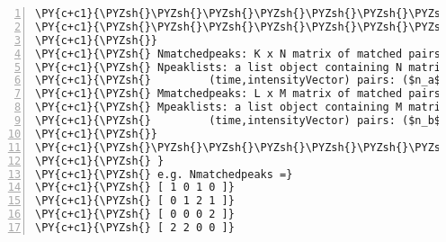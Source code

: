 \begin{Verbatim}[commandchars=\\\{\},codes={\catcode`\$=3\catcode`\^=7\catcode`\_=8},gobble=0,numbers=left,fontfamily=fvm,fontshape=n,fontsize=\footnotesize,tabsize=2]
\PY{c+c1}{\PYZsh{}\PYZsh{}\PYZsh{}\PYZsh{}\PYZsh{}\PYZsh{}\PYZsh{}\PYZsh{}\PYZsh{}\PYZsh{}\PYZsh{}\PYZsh{}\PYZsh{}\PYZsh{}\PYZsh{}\PYZsh{}\PYZsh{}\PYZsh{}\PYZsh{}\PYZsh{}\PYZsh{}\PYZsh{}\PYZsh{}\PYZsh{}\PYZsh{}\PYZsh{}\PYZsh{}\PYZsh{}\PYZsh{}\PYZsh{}\PYZsh{}\PYZsh{}\PYZsh{}\PYZsh{}\PYZsh{}\PYZsh{}\PYZsh{}\PYZsh{}\PYZsh{} Input \PYZsh{}\PYZsh{}\PYZsh{}\PYZsh{}\PYZsh{}\PYZsh{}\PYZsh{}\PYZsh{}\PYZsh{}\PYZsh{}\PYZsh{}\PYZsh{}\PYZsh{}\PYZsh{}\PYZsh{}\PYZsh{}\PYZsh{}\PYZsh{}\PYZsh{}\PYZsh{}\PYZsh{}\PYZsh{}\PYZsh{}\PYZsh{}\PYZsh{}\PYZsh{}\PYZsh{}\PYZsh{}\PYZsh{}\PYZsh{}\PYZsh{}\PYZsh{}\PYZsh{}}
\PY{c+c1}{\PYZsh{}\PYZsh{}\PYZsh{}\PYZsh{}\PYZsh{}\PYZsh{}\PYZsh{}\PYZsh{}\PYZsh{}\PYZsh{}\PYZsh{}\PYZsh{}\PYZsh{}\PYZsh{}\PYZsh{}\PYZsh{}\PYZsh{}\PYZsh{}\PYZsh{}\PYZsh{}\PYZsh{}\PYZsh{}\PYZsh{}\PYZsh{}\PYZsh{}\PYZsh{}\PYZsh{}\PYZsh{}\PYZsh{}\PYZsh{}\PYZsh{}\PYZsh{}\PYZsh{}\PYZsh{}\PYZsh{}\PYZsh{}\PYZsh{}\PYZsh{}\PYZsh{}\PYZsh{}\PYZsh{}\PYZsh{}\PYZsh{}\PYZsh{}\PYZsh{}\PYZsh{}\PYZsh{}\PYZsh{}\PYZsh{}\PYZsh{}\PYZsh{}\PYZsh{}\PYZsh{}\PYZsh{}\PYZsh{}\PYZsh{}\PYZsh{}\PYZsh{}\PYZsh{}\PYZsh{}\PYZsh{}\PYZsh{}\PYZsh{}\PYZsh{}\PYZsh{}\PYZsh{}\PYZsh{}\PYZsh{}\PYZsh{}\PYZsh{}\PYZsh{}\PYZsh{}\PYZsh{}\PYZsh{}\PYZsh{}\PYZsh{}\PYZsh{}\PYZsh{}\PYZsh{}}
\PY{c+c1}{\PYZsh{}}
\PY{c+c1}{\PYZsh{} Nmatchedpeaks: K x N matrix of matched pairs of the N alignment}
\PY{c+c1}{\PYZsh{} Npeaklists: a list object containing N matricies of  }
\PY{c+c1}{\PYZsh{}         (time,intensityVector) pairs: ($n_a$ x ($n_{Comp}$+1) matrix, a=1,...,N)}
\PY{c+c1}{\PYZsh{} Mmatchedpeaks: L x M matrix of matched pairs of the M alignment}
\PY{c+c1}{\PYZsh{} Mpeaklists: a list object containing M matricies of  }
\PY{c+c1}{\PYZsh{}         (time,intensityVector) pairs: ($n_b$ x ($n_{Comp}$+1) matrix, b=1,...,M)}
\PY{c+c1}{\PYZsh{}}
\PY{c+c1}{\PYZsh{}\PYZsh{}\PYZsh{}\PYZsh{}\PYZsh{}\PYZsh{}\PYZsh{}\PYZsh{}\PYZsh{}\PYZsh{}\PYZsh{}\PYZsh{}\PYZsh{}\PYZsh{}\PYZsh{}\PYZsh{}\PYZsh{}\PYZsh{}\PYZsh{}\PYZsh{}\PYZsh{}\PYZsh{}\PYZsh{}\PYZsh{}\PYZsh{}\PYZsh{}\PYZsh{}\PYZsh{}\PYZsh{}\PYZsh{}\PYZsh{}\PYZsh{}\PYZsh{}\PYZsh{}\PYZsh{}\PYZsh{}\PYZsh{}\PYZsh{}\PYZsh{}\PYZsh{}\PYZsh{}\PYZsh{}\PYZsh{}\PYZsh{}\PYZsh{}\PYZsh{}\PYZsh{}\PYZsh{}\PYZsh{}\PYZsh{}\PYZsh{}\PYZsh{}\PYZsh{}\PYZsh{}\PYZsh{}\PYZsh{}\PYZsh{}\PYZsh{}\PYZsh{}\PYZsh{}\PYZsh{}\PYZsh{}\PYZsh{}\PYZsh{}\PYZsh{}\PYZsh{}\PYZsh{}\PYZsh{}\PYZsh{}\PYZsh{}\PYZsh{}\PYZsh{}\PYZsh{}\PYZsh{}\PYZsh{}\PYZsh{}\PYZsh{}\PYZsh{}\PYZsh{}}
\PY{c+c1}{\PYZsh{} }
\PY{c+c1}{\PYZsh{} e.g. Nmatchedpeaks =}
\PY{c+c1}{\PYZsh{} [ 1 0 1 0 ]}
\PY{c+c1}{\PYZsh{} [ 0 1 2 1 ]}
\PY{c+c1}{\PYZsh{} [ 0 0 0 2 ]}
\PY{c+c1}{\PYZsh{} [ 2 2 0 0 ]}

\end{Verbatim}
